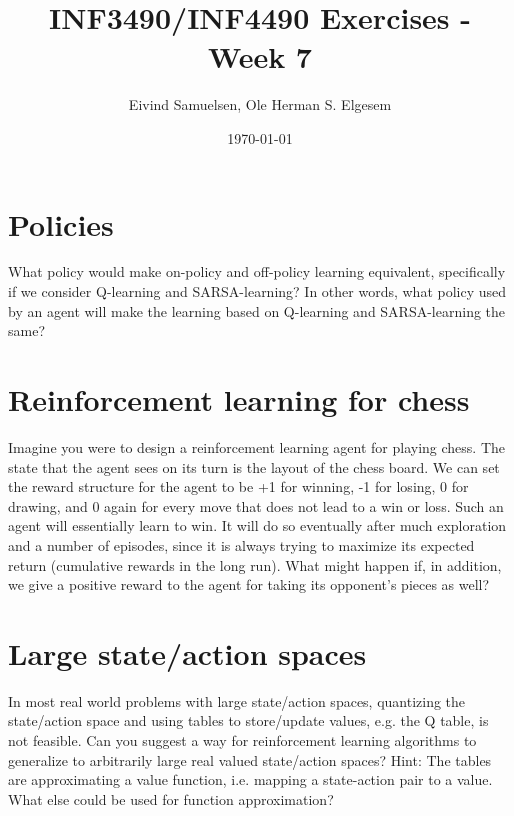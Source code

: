 \documentclass{article}           %
\title{\vspace{-2cm}INF3490/INF4490 Exercises - Week 7}
\author{Eivind Samuelsen, Ole Herman S. Elgesem}
\date{\today}
\newcommand\marginsymbol[1][0pt]{%
  \tabto*{0cm}\makebox[\dimexpr-1cm-#1\relax][r]{$\mathbb{P}$}\tabto*{\TabPrevPos}}
\begin{document}
    \renewcommand\marginsymbol[1][0pt]{%
  \tabto*{0cm}\makebox[-1cm][c]{$\mathbb{P}$}\tabto*{\TabPrevPos}}

\maketitle


\section{Policies}
What policy would make on-policy and off-policy learning equivalent,
specifically if we consider Q-learning and SARSA-learning?
In other words, what policy used by an agent will make the learning based on Q-learning and SARSA-learning the same?

\section{Reinforcement learning for chess}
Imagine you were to design a reinforcement learning agent for playing chess.
The state that the agent sees on its turn is the layout of the chess board.
We can set the reward structure for the agent to be +1 for winning, -1 for losing, 0 for drawing, and 0 again for every move that does not lead to a win or loss.
Such an agent will essentially learn to win.
It will do so eventually after much exploration and a number of episodes, since it is always trying to maximize its expected return (cumulative rewards in the long run).
What might happen if, in addition, we give a positive reward to the agent for taking its opponent's pieces as well?

\section{Large state/action spaces}
In most real world problems with large state/action spaces, quantizing the state/action space and using tables to store/update values, e.g. the Q table, is not feasible.
Can you suggest a way for reinforcement learning algorithms to generalize to arbitrarily large real valued state/action spaces?
Hint: The tables are approximating a value function, i.e. mapping a state-action pair to a value.
What else could be used for function approximation?


\end{document}
